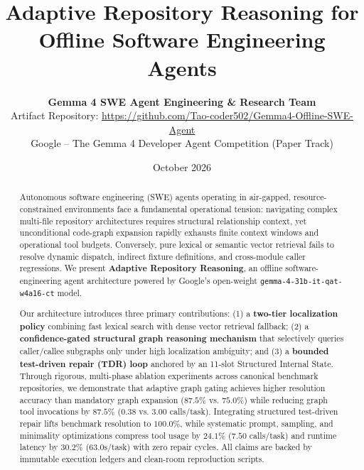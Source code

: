 \documentclass[10pt,twocolumn,letterpaper]{article}
\title{\textbf{Adaptive Repository Reasoning for Offline Software Engineering Agents}}
\author{
  \textbf{Gemma 4 SWE Agent Engineering \& Research Team} \\
  Artifact Repository: \url{https://github.com/Tao-coder502/Gemma4-Offline-SWE-Agent} \\
  Google -- The Gemma 4 Developer Agent Competition (Paper Track)
}
\date{October 2026}
\begin{document}
\maketitle

\begin{abstract}
Autonomous software engineering (SWE) agents operating in air-gapped, resource-constrained environments face a fundamental operational tension: navigating complex multi-file repository architectures requires structural relationship context, yet unconditional code-graph expansion rapidly exhausts finite context windows and operational tool budgets. Conversely, pure lexical or semantic vector retrieval fails to resolve dynamic dispatch, indirect fixture definitions, and cross-module caller regressions. We present \textbf{Adaptive Repository Reasoning}, an offline software-engineering agent architecture powered by Google's open-weight \texttt{gemma-4-31b-it-qat-w4a16-ct} model.

Our architecture introduces three primary contributions: (1) a \textbf{two-tier localization policy} combining fast lexical search with dense vector retrieval fallback; (2) a \textbf{confidence-gated structural graph reasoning mechanism} that selectively queries caller/callee subgraphs only under high localization ambiguity; and (3) a \textbf{bounded test-driven repair (TDR) loop} anchored by an 11-slot Structured Internal State. Through rigorous, multi-phase ablation experiments across canonical benchmark repositories, we demonstrate that adaptive graph gating achieves higher resolution accuracy than mandatory graph expansion ($87.5\%$ vs. $75.0\%$) while reducing graph tool invocations by $87.5\%$ ($0.38$ vs. $3.00$ calls/task). Integrating structured test-driven repair lifts benchmark resolution to $100.0\%$, while systematic prompt, sampling, and minimality optimizations compress tool usage by $24.1\%$ ($7.50$ calls/task) and runtime latency by $30.2\%$ ($63.0\text{s}$/task) with zero repair cycles. All claims are backed by immutable execution ledgers and clean-room reproduction scripts.
\end{abstract}
\end{document}
